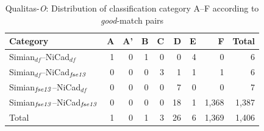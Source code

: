 \documentclass{IEEEtran}
\begin{document}

\begin{table}[H]
	\centering
	\caption{Qualitas-\textit{O}: Distribution of classification category A--F according to \textit{good}-match pairs}
	\label{tab:good_classification}
	\begin{tabular}{|l|r|r|r|r|r|r|r|r|}
		\hline 
		Category   & A   & 	A'   & 	B   & C   & D   &	E   &	F   & Total  \\
		\hline
		Simian$_{df}$--NiCad$_{df}$   & 1 & 0 & 1 & 0 & 0 & 4 & 0 & 6 \\
		Simian$_{df}$--NiCad$_{\textrm{\textit{fse13}}}$   & 0 & 0 & 0 & 3 & 1 & 1 & 1 & 6 \\
		Simian$_{\textrm{\textit{fse13}}}$--NiCad$_{df}$   & 0 & 0 & 0 & 0 & 7 & 0 & 0 & 7 \\
		Simian$_{\textrm{\textit{fse13}}}$--NiCad$_{\textrm{\textit{fse13}}}$   & 0 & 0 & 0 & 0 & 18 & 1 & 1,368 & 1,387 \\
		\hline
		Total   &   1   &   0   &   1   &   3   &   26   &   6   & 1,369  & 1,406 \\
		\hline
	\end{tabular} 
\end{table}
\end{document}
